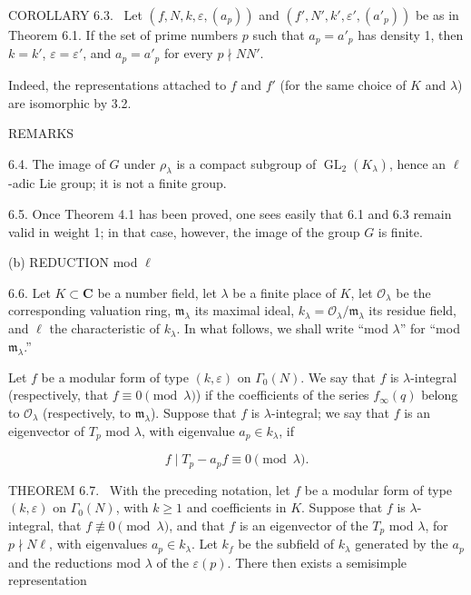 \documentclass[10pt,oneside]{article}
\begin{document}
\noindent\textsc{COROLLARY 6.3.} \textemdash\ Let \((f,N,k,\varepsilon,(a_p))\) and \((f',N',k',\varepsilon',(a'_p))\) be as in Theorem 6.1. If the set of prime numbers \(p\) such that \(a_p=a'_p\) has density 1, then \(k=k'\), \(\varepsilon=\varepsilon'\), and \(a_p=a'_p\) for every \(p\nmid NN'\).\par

Indeed, the representations attached to \(f\) and \(f'\) (for the same choice of \(K\) and \(\lambda\)) are isomorphic by 3.2.\par

REMARKS\par

6.4. The image of \(G\) under \(\rho_\lambda\) is a compact subgroup of \(\operatorname{GL}_2(K_\lambda)\), hence an \(\ell\)-adic Lie group; it is not a finite group.\par

6.5. Once Theorem 4.1 has been proved, one sees easily \footnotemark[2] that 6.1 and 6.3 remain valid in weight 1; in that case, however, the image of the group \(G\) is finite.\par

(b) REDUCTION mod \(\ell\)\par

6.6. Let \(K\subset\mathbf{C}\) be a number field, let \(\lambda\) be a finite place of \(K\), let \(\mathcal{O}_\lambda\) be the corresponding valuation ring, \(\mathfrak{m}_\lambda\) its maximal ideal, \(k_\lambda=\mathcal{O}_\lambda/\mathfrak{m}_\lambda\) its residue field, and \(\ell\) the characteristic of \(k_\lambda\). In what follows, we shall write “mod \(\lambda\)” for “mod \(\mathfrak{m}_\lambda\).”\par

Let \(f\) be a modular form of type \((k,\varepsilon)\) on \(\Gamma_0(N)\). We say that \(f\) is \(\lambda\)-integral (respectively, that \(f\equiv0\pmod\lambda\)) if the coefficients of the series \(f_\infty(q)\) belong to \(\mathcal{O}_\lambda\) (respectively, to \(\mathfrak{m}_\lambda\)). Suppose that \(f\) is \(\lambda\)-integral; we say that \(f\) is an eigenvector of \(T_p\) mod \(\lambda\), with eigenvalue \(a_p\in k_\lambda\), if\par

\begin{equation*}
\tag{6.6.1}
f\mid T_p-a_pf\equiv0\pmod\lambda.
\end{equation*}

\noindent\textsc{THEOREM 6.7.} \textemdash\ With the preceding notation, let \(f\) be a modular form of type \((k,\varepsilon)\) on \(\Gamma_0(N)\), with \(k\geq1\) and coefficients in \(K\). Suppose that \(f\) is \(\lambda\)-integral, that \(f\not\equiv0\pmod\lambda\), and that \(f\) is an eigenvector of the \(T_p\) mod \(\lambda\), for \(p\nmid N\ell\), with eigenvalues \(a_p\in k_\lambda\). Let \(k_f\) be the subfield of \(k_\lambda\) generated by the \(a_p\) and the reductions mod \(\lambda\) of the \(\varepsilon(p)\). There then exists a semisimple representation\par
\end{document}

